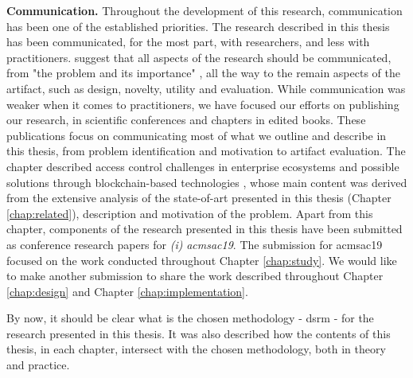 \textbf{Communication.} Throughout the development of this research, communication has been one of the established priorities. The research described in this thesis has been communicated, for the most part, with researchers, and less with practitioners. \citeauthor{peffers_design_2007} \cite{peffers_design_2007} suggest that all aspects of the research should be communicated, from "the problem and its importance" \cite[14]{peffers_design_2007}, all the way to the remain aspects of the artifact, such as design, novelty, utility and evaluation. While communication was weaker when it comes to practitioners, we have focused our efforts on publishing our research, in scientific conferences and chapters in edited books. These publications focus on communicating most of what we outline and describe in this thesis, from problem identification and motivation to artifact evaluation. The chapter described access control challenges in enterprise ecosystems and possible solutions through blockchain-based technologies \cite{bryan_christiansen_access_2018}, whose main content was derived from the extensive analysis of the state-of-art presented in this thesis (Chapter \ref{chap:related}), description and motivation of the problem. Apart from this chapter, components of the research presented in this thesis have been submitted as conference research papers for \emph{(i)} \textit{\gls{acmsac19}}. The submission for \gls{acmsac19} focused on the work conducted throughout Chapter \ref{chap:study}. We would like to make another submission to share the work described throughout Chapter \ref{chap:design} and Chapter \ref{chap:implementation}.

By now, it should be clear what is the chosen methodology - \glsdesc{dsrm} \cite{peffers_design_2007} - for the research presented in this thesis. It was also described how the contents of this thesis, in each chapter, intersect with the chosen methodology, both in theory and practice.